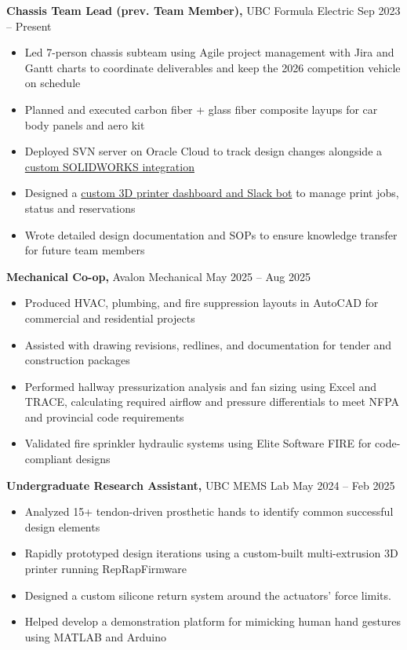 \documentclass[11pt]{article}       %
\newcommand{\utmSource}{website}
\newcommand{\utmMedium}{resume}
\newcommand{\utmCampaign}{evergreen}
\newcommand{\utmContent}{general_resume}
\newcommand{\trackedPortfolioURL}[1]{%
  https://www.danielrbenjamin.com/#1?utm_source=\utmSource\&utm_medium=\utmMedium\&utm_campaign=\utmCampaign\&utm_content=\utmContent%
}
\newcommand{\portfolioLink}[2]{%
  \href{\trackedPortfolioURL{#1}}{#2}%
}
\begin{document}
\textbf{Chassis Team Lead \textnormal{(prev. Team Member)},} {UBC Formula Electric} \hfill Sep 2023 -- Present \\
\vspace{-8.5pt}
\begin{itemize}
  \item Led 7-person chassis subteam using Agile project management with Jira and Gantt charts to coordinate deliverables and keep the 2026 competition vehicle on schedule
  \item Planned and executed carbon fiber + glass fiber composite layups for car body panels and aero kit
  \item Deployed SVN server on Oracle Cloud to track design changes alongside a \portfolioLink{projects/cad-infra/}{custom SOLIDWORKS integration}
  \item Designed a \portfolioLink{projects/danbot/}{custom 3D printer dashboard and Slack bot} to manage print jobs, status and reservations
  \item Wrote detailed design documentation and SOPs to ensure knowledge transfer for future team members
\end{itemize}

\vspace{3pt}

\textbf{Mechanical Co-op,} {Avalon Mechanical} \hfill May 2025 -- Aug 2025 \\
\vspace{-8.5pt}
\begin{itemize}
  \item Produced HVAC, plumbing, and fire suppression layouts in AutoCAD for commercial and residential projects
  \item Assisted with drawing revisions, redlines, and documentation for tender and construction packages
  \item Performed hallway pressurization analysis and fan sizing using Excel and TRACE, calculating required airflow and pressure differentials to meet NFPA and provincial code requirements
  \item Validated fire sprinkler hydraulic systems using Elite Software FIRE for code-compliant designs
\end{itemize}

\vspace{3pt}

\textbf{Undergraduate Research Assistant,} {UBC MEMS Lab} \hfill May 2024 -- Feb 2025 \\
\vspace{-8.5pt}
\begin{itemize}
  \item Analyzed 15+ tendon-driven prosthetic hands to identify common successful design elements
  \item Rapidly prototyped design iterations using a custom-built multi-extrusion 3D printer running RepRapFirmware
  \item Designed a custom silicone return system around the actuators' force limits. 
  \item Helped develop a demonstration platform for mimicking human hand gestures using MATLAB and Arduino
\end{itemize}
\end{document}
